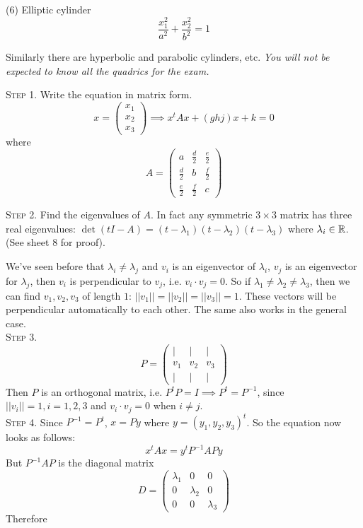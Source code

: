 \documentclass[10pt]{scrartcl}
\begin{document}
(6) Elliptic cylinder 
\[\frac{x_1^2}{a^2} + \frac{x_2^2}{b^2} = 1\]

Similarly there are hyperbolic and parabolic cylinders, etc. \emph{You will not be expected to know all the quadrics for the exam.} 



\textsc{Step 1.} Write the equation in matrix form. 
\[
  x = \begin{pmatrix}
 x_1 \\ x_2 \\ x_3	
 \end{pmatrix}\implies x^tAx + (ghj)x + k = 0
\]
where 
\[
  A = \begin{pmatrix}
 a & \frac{d}{2} & \frac{e}{2} \\ \frac{d}{2} & b & \frac{f}{2} \\ \frac{e}{2} & \frac{f}{2} & c 	
 \end{pmatrix}
\]\vsp

\textsc{Step 2.} Find the eigenvalues of $A$. In fact any symmetric $3 \times 3$ matrix has three real eigenvalues: $\det(tI-A) = (t-\lambda_1)(t-\lambda_2)(t-\lambda_3)$ where $\lambda_i\in\mathbb{R}$. (See sheet 8 for proof). 

We've seen before that $\lambda_i \neq \lambda_j$ and $v_i$ is an eigenvector of $\lambda_i$, $v_j$ is an eigenvector for $\lambda_j$, then $v_i$ is perpendicular to $v_j$, i.e. $v_i \cdot v_j = 0$. So if $\lambda_1 \neq \lambda_2 \neq \lambda_3$, then we can find $v_1,v_2,v_3$ of length $1$: $||v_1|| = ||v_2|| = ||v_3|| = 1$. These vectors will be perpendicular automatically to each other. The same also works in the general case.\\ 

\textsc{Step 3.} 
\[
  P = \begin{pmatrix}
  | & | & | \\ v_1 & v_2 & v_3 \\ | & | &| 	
 \end{pmatrix}
\]
Then $P$ is an orthogonal matrix, i.e. $P^tP =I \implies P^t = P^{-1}$, since $||v_i|| = 1, i = 1,2,3$ and $v_i \cdot v_j = 0$ when $i \neq j$.\\


\textsc{Step 4.} Since $P^{-1} = P^t$, $x = Py$ where $y=(y_1,y_2,y_3)^t$. So the equation now looks as follows:
\[
  x^tAx = y^tP^{-1}APy
\]
But $P^{-1}AP$ is the diagonal matrix \[
  D = \begin{pmatrix}
 \lambda_1 & 0 & 0\\ 0 & \lambda_2 & 0 \\ 0 & 0 & \lambda_3	
 \end{pmatrix}
\]
Therefore 
\end{document}
